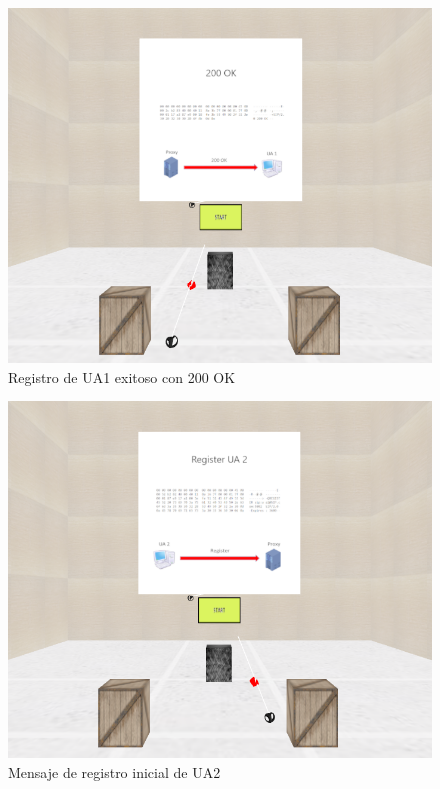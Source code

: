 \documentclass[a4paper, 12pt]{book}
\begin{document}
\begin{figure}
  \centering
  \includegraphics[width=12cm, keepaspectratio]{img/resultados/02-200OK.png}
  \caption{Registro de UA1 exitoso con 200 OK}
  \label{fig:02-200OK}
\end{figure}
\begin{figure}
  \centering
  \includegraphics[width=12cm, keepaspectratio]{img/resultados/03-Register_UA2.png}
  \caption{Mensaje de registro inicial de UA2}
  \label{fig:03-Register_UA2}
\end{figure}
\end{document}
